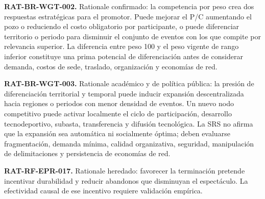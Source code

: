 \documentclass[10pt,letterpaper]{article}
\begin{document}
\noindent\textbf{RAT-BR-WGT-002.} Rationale confirmado: la competencia por peso crea dos respuestas estratégicas para el promotor. Puede mejorar el P/C aumentando el pozo o reduciendo el costo obligatorio por participante, o puede diferenciar territorio o periodo para disminuir el conjunto de eventos con los que compite por relevancia superior. La diferencia entre peso 100 y el peso vigente de rango inferior constituye una prima potencial de diferenciación antes de considerar demanda, costos de sede, traslado, organización y economías de red.\par
\noindent\textbf{RAT-BR-WGT-003.} Rationale académico y de política pública: la presión de diferenciación territorial y temporal puede inducir expansión descentralizada hacia regiones o periodos con menor densidad de eventos. Un nuevo nodo competitivo puede activar localmente el ciclo de participación, desarrollo tecnodeportivo, subasta, transferencia y difusión tecnológica. La SRS no afirma que la expansión sea automática ni socialmente óptima; deben evaluarse fragmentación, demanda mínima, calidad organizativa, seguridad, manipulación de delimitaciones y persistencia de economías de red.\par
\noindent\textbf{RAT-RF-EPR-017.} Rationale heredado: favorecer la terminación pretende incentivar durabilidad y reducir abandonos que disminuyan el espectáculo. La efectividad causal de ese incentivo requiere validación empírica.\par
\end{document}
